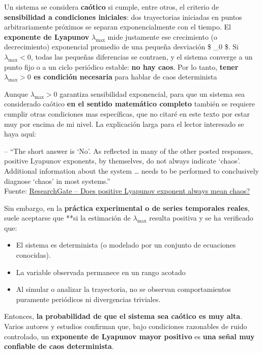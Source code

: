 \documentclass[
  11pt,
  a4paper,
  DIV=11,
  numbers=noendperiod]{scrreprt}
\providecommand{\tightlist}{%
  \setlength{\itemsep}{0pt}\setlength{\parskip}{0pt}}
\begin{document}
Un sistema se considera \textbf{caótico} si cumple, entre otros, el
criterio de \textbf{sensibilidad a condiciones iniciales}: dos
trayectorias iniciadas en puntos arbitrariamente próximos se separan
exponencialmente con el tiempo. El \textbf{exponente de Lyapunov}
\(\lambda_{\max}\) mide justamente ese crecimiento (o decrecimiento)
exponencial promedio de una pequeña desviación \$ \delta\_0 \$. Si
\(\lambda_{\max} < 0\), todas las pequeñas diferencias se contraen, y el
sistema converge a un punto fijo o a un ciclo periódico estable:
\textbf{no hay caos}. Por lo tanto, \textbf{tener \(\lambda_{\max} > 0\)
es condición necesaria} para hablar de caos determinista

Aunque \(\lambda_{\max} > 0\) garantiza sensibilidad exponencial, para
que un sistema sea considerado caótico \textbf{en el sentido matemático
completo} también se requiere cumplir otras condiciones mas específicas,
que no citaré en este texto por estar muy por encima de mi nivel. La
explicación larga para el lector interesado se haya aquí:

-- ``The short answer is `No'. As reflected in many of the other posted
responses, positive Lyapunov exponents, by themselves, do not always
indicate `chaos'. Additional information about the system \ldots{} needs
to be performed to conclusively diagnose `chaos' in most systems.''\\
Fuente:
\href{https://www.researchgate.net/post/Does-positive-Lyapunov-exponent-always-mean-chaos}{ResearchGate
-- Does positive Lyapunov exponent always mean chaos?}

Sin embargo, en la \textbf{práctica experimental o de series temporales
reales}, suele aceptarse que **si la estimación de \(\lambda_{\max}\)
resulta positiva y se ha verificado que:

\begin{itemize}
\tightlist
\item
  El sistema es determinista (o modelado por un conjunto de ecuaciones
  conocidas).\\
\item
  La variable observada permanece en un rango acotado
\item
  Al simular o analizar la trayectoria, no se observan comportamientos
  puramente periódicos ni divergencias triviales.
\end{itemize}

Entonces, \textbf{la probabilidad de que el sistema sea caótico es muy
alta}. Varios autores y estudios confirman que, bajo condiciones
razonables de ruido controlado, un \textbf{exponente de Lyapunov mayor
positivo} es \textbf{una señal muy confiable de caos determinista}.
\end{document}
